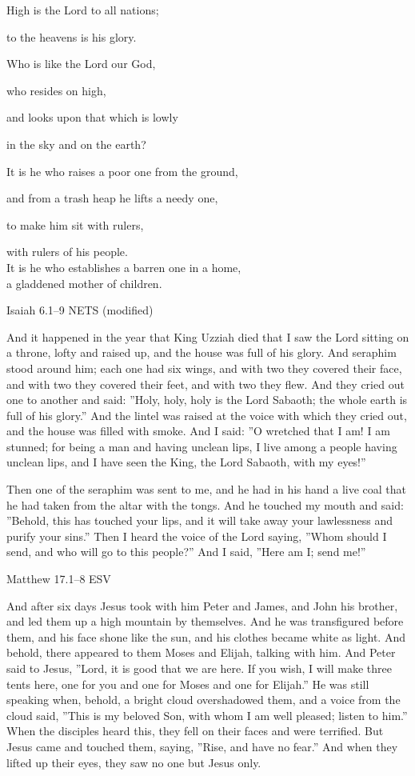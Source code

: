 \documentclass[
]{article}
\newcommand{\RL}[1]{\beginR #1\endR}
\begin{document}
High is the Lord to all nations;

to the heavens is his glory.

Who is like the Lord our God,

who resides on high,

and looks upon that which is lowly

in the sky and on the earth?

It is he who raises a poor one from the ground,

and from a trash heap he lifts a needy one,

to make him sit with rulers,

with rulers of his people.\\
It is he who establishes a barren one in a home,\\
a gladdened mother of children.

Isaiah 6.1--9 NETS (modified)

And it happened in the year that King Uzziah died that I saw the Lord
sitting on a throne, lofty and raised up, and the house was full of his
glory. And seraphim stood around him; each one had six wings, and with
two they covered their face, and with two they covered their feet, and
with two they flew. And they cried out one to another and said:
\RL{''}Holy, holy, holy is the Lord Sabaoth; the whole earth is full of
his glory.'' And the lintel was raised at the voice with which they
cried out, and the house was filled with smoke. And I said: \RL{''}O
wretched that I am! I am stunned; for being a man and having unclean
lips, I live among a people having unclean lips, and I have seen the
King, the Lord Sabaoth, with my eyes!''

Then one of the seraphim was sent to me, and he had in his hand a live
coal that he had taken from the altar with the tongs. And he touched my
mouth and said: \RL{''}Behold, this has touched your lips, and it will
take away your lawlessness and purify your sins.'' Then I heard the
voice of the Lord saying, \RL{''}Whom should I send, and who will go to
this people?'' And I said, \RL{''}Here am I; send me!''

Matthew 17.1--8 ESV

And after six days Jesus took with him Peter and James, and John his
brother, and led them up a high mountain by themselves. And he was
transfigured before them, and his face shone like the sun, and his
clothes became white as light. And behold, there appeared to them Moses
and Elijah, talking with him. And Peter said to Jesus, \RL{''}Lord, it
is good that we are here. If you wish, I will make three tents here, one
for you and one for Moses and one for Elijah.'' He was still speaking
when, behold, a bright cloud overshadowed them, and a voice from the
cloud said, \RL{''}This is my beloved Son, with whom I am well pleased;
listen to him.'' When the disciples heard this, they fell on their faces
and were terrified. But Jesus came and touched them, saying,
\RL{''}Rise, and have no fear.'' And when they lifted up their eyes,
they saw no one but Jesus only.
\end{document}
